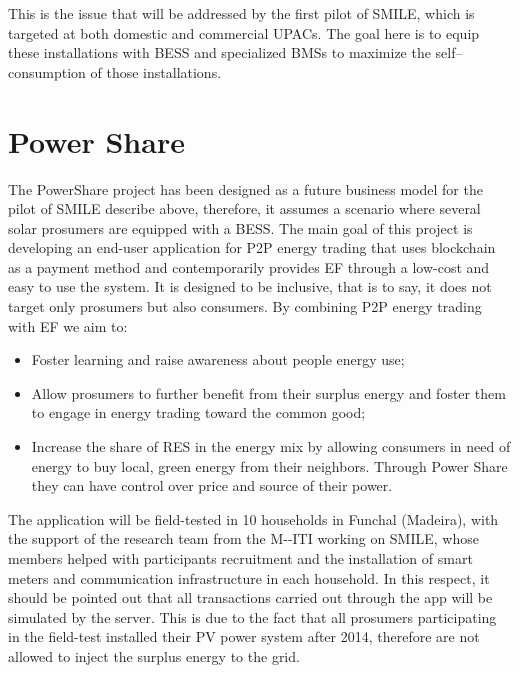 This is the issue that will be addressed by the first pilot of SMILE, which is targeted at both domestic and commercial \acp{UPAC}. The goal here is to equip these installations with BESS and specialized \acp{BMS} to maximize the self--consumption of those installations.


\section{Power Share}
The PowerShare project has been designed as a future business model for the pilot of SMILE describe above, therefore, it assumes a scenario where several solar prosumers are equipped with a \ac{BESS}.
The main goal of this project is developing an end-user application for P2P energy trading that uses blockchain as a payment method and contemporarily provides \ac{EF} through a low-cost and easy to use the system. It is designed to be inclusive, that is to say, it does not target only prosumers but also consumers. By combining P2P energy trading with \ac{EF} we aim to:

\begin{itemize}
\item Foster learning and raise awareness about people energy use;
\item Allow prosumers to further benefit from their surplus energy and foster them to engage in energy trading toward the common good;
\item Increase the share of RES in the energy mix by allowing consumers in need of energy to buy local, green energy from their neighbors. Through Power Share they can have control over price and source of their power.
\end{itemize}


The application will be field-tested in 10 households in Funchal (Madeira), with the support of the research team from the \ac{M--ITI} working on SMILE, whose members helped with participants recruitment and the installation of smart meters and communication infrastructure in each household.
In this respect, it should be pointed out that all transactions carried out through the app will be simulated by the server. This is due to the fact that all prosumers participating in the field-test installed their \ac{PV} power system after 2014, therefore are not allowed to inject the surplus energy to the grid.



